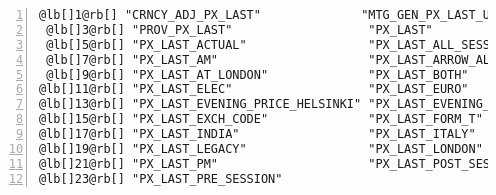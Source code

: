 \documentclass[a4paper]{article}
\begin{document}
\begin{Verbatim}[commandchars=@\[\],numbers=left,firstnumber=1,stepnumber=1]
 @lb[]1@rb[] "CRNCY_ADJ_PX_LAST"              "MTG_GEN_PX_LAST_UPDATE"        
 @lb[]3@rb[] "PROV_PX_LAST"                   "PX_LAST"                       
 @lb[]5@rb[] "PX_LAST_ACTUAL"                 "PX_LAST_ALL_SESSIONS"          
 @lb[]7@rb[] "PX_LAST_AM"                     "PX_LAST_ARROW_ALL_SESSION"     
 @lb[]9@rb[] "PX_LAST_AT_LONDON"              "PX_LAST_BOTH"                  
@lb[]11@rb[] "PX_LAST_ELEC"                   "PX_LAST_EURO"                  
@lb[]13@rb[] "PX_LAST_EVENING_PRICE_HELSINKI" "PX_LAST_EVENING_TRADE_HELSINKI"
@lb[]15@rb[] "PX_LAST_EXCH_CODE"              "PX_LAST_FORM_T"                
@lb[]17@rb[] "PX_LAST_INDIA"                  "PX_LAST_ITALY"                 
@lb[]19@rb[] "PX_LAST_LEGACY"                 "PX_LAST_LONDON"                
@lb[]21@rb[] "PX_LAST_PM"                     "PX_LAST_POST_SESSION"          
@lb[]23@rb[] "PX_LAST_PRE_SESSION"           
\end{Verbatim}

    



\end{document}
